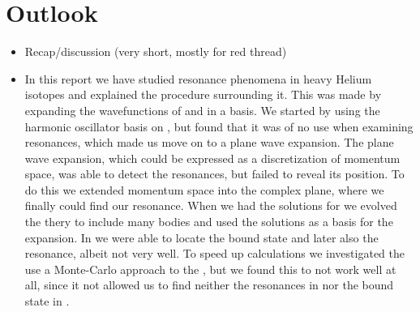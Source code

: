 \documentclass[../main/report.tex]{subfiles}
\begin{document}
\chapter{Outlook}
\label{cha:outlook}

\begin{itemize}
  \item Recap/discussion (very short, mostly for red thread)
  \item In this report we have studied resonance phenomena in heavy Helium isotopes and explained the procedure surrounding it.
  This was made by expanding the wavefunctions of  and  in a basis.
  We started by using the harmonic oscillator basis on , but found that it was of no use when examining resonances, which made us move on to a plane wave expansion.
  The plane wave expansion, which could be expressed as a discretization of momentum space, was able to detect the resonances, but failed to reveal its position.
  To do this we extended momentum space into the complex plane, where we finally could find our resonance.
  When we had the solutions for  we evolved the thery to include many bodies and used the solutions as a basis for the  expansion.
  In  we were able to locate the bound state and later also the resonance, albeit not very well.
  To speed up calculations we investigated the use a Monte-Carlo approach to the , but we found this to not work well at all, since it not allowed us to find neither the resonances in  nor the bound state in .
  

\end{itemize}
\end{document}

